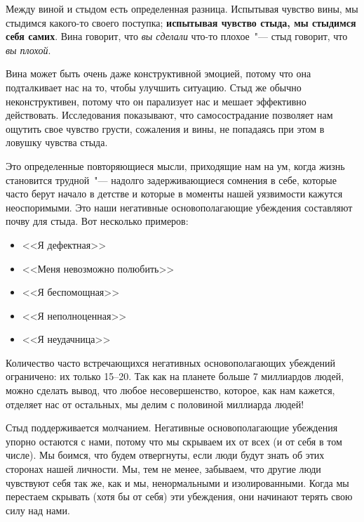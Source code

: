 Между виной и стыдом есть определенная разница. Испытывая чувство вины, мы стыдимся какого-то своего поступка; \textbf{испытывая чувство стыда, мы стыдимся себя самих}\cite{90}. Вина говорит, что \emph{вы сделали} что-то плохое~"--- стыд говорит, что \emph{вы плохой}. 

Вина может быть очень даже конструктивной эмоцией, потому что она подталкивает нас на то, чтобы улучшить ситуацию. Стыд же обычно неконструктивен, потому что он парализует нас и мешает эффективно действовать. Исследования показывают, что самосострадание позволяет нам ощутить свое чувство грусти, сожаления и вины, не попадаясь при этом в ловушку чувства стыда\cite{91}. 

\vspace{3ex}


\vspace{1ex}

Это определенные повторяющиеся мысли, приходящие нам на ум, когда жизнь становится 
трудной~"--- надолго задерживающиеся сомнения в себе, которые часто берут начало в детстве и которые в моменты нашей уязвимости кажутся неоспоримыми. Это наши негативные основополагающие убеждения составляют почву для стыда\cite{92}. Вот несколько примеров:
\begin{itemize}
	\item <<Я дефектная>>
	\item <<Меня невозможно полюбить>>
	\item <<Я беспомощная>>
	\item <<Я неполноценная>>
	\item <<Я неудачница>>
\end{itemize}

Количество часто встречающихся негативных основополагающих убеждений ограничено: их только 15--20. Так как на планете больше 7 миллиардов людей, можно сделать вывод, что любое несовершенство, которое, как нам кажется, отделяет нас от остальных, мы делим с половиной миллиарда людей!

Стыд поддерживается молчанием. Негативные основополагающие убеждения упорно остаются с нами, потому что мы скрываем их от всех (и от себя в том числе). Мы боимся, что будем отвергнуты, если люди будут знать об этих сторонах нашей личности. Мы, тем не менее, забываем, что другие люди чувствуют себя так же, как и мы, ненормальными и изолированными. Когда мы перестаем скрывать (хотя бы от себя) эти убеждения, они начинают терять свою силу над нами. 

